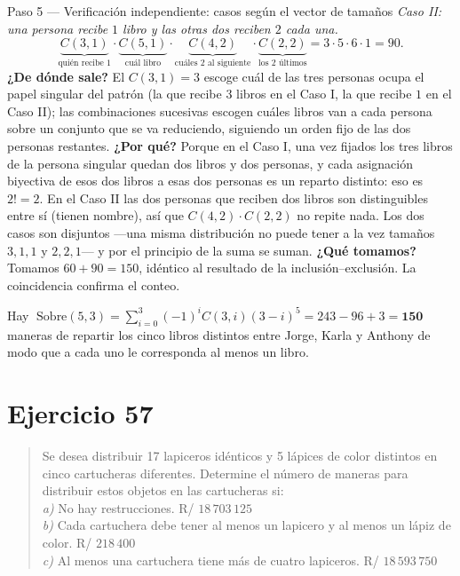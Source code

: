 \documentclass[11pt]{article}
\begin{document}
\begin{sol}
\begin{paso}{Paso 5 --- Verificación independiente: casos según el vector de tamaños}
\medskip
\emph{Caso II: una persona recibe $1$ libro y las otras dos reciben $2$ cada una.}
\[
\underbrace{C(3,1)}_{\text{quién recibe }1}\cdot\underbrace{C(5,1)}_{\text{cuál libro}}\cdot\underbrace{C(4,2)}_{\text{cuáles 2 al siguiente}}\cdot\underbrace{C(2,2)}_{\text{los 2 últimos}}=3\cdot 5\cdot 6\cdot 1=90 .
\]
\textbf{¿De dónde sale?} El $C(3,1)=3$ escoge cuál de las tres personas ocupa el papel singular del patrón (la que recibe $3$ libros en el Caso I, la que recibe $1$ en el Caso II); las combinaciones sucesivas escogen cuáles libros van a cada persona sobre un conjunto que se va reduciendo, siguiendo un orden fijo de las dos personas restantes.
\textbf{¿Por qué?} Porque en el Caso I, una vez fijados los tres libros de la persona singular quedan dos libros y dos personas, y cada asignación biyectiva de esos dos libros a esas dos personas es un reparto distinto: eso es $2!=2$. En el Caso II las dos personas que reciben dos libros son distinguibles entre sí (tienen nombre), así que $C(4,2)\cdot C(2,2)$ no repite nada. Los dos casos son disjuntos —una misma distribución no puede tener a la vez tamaños $3,1,1$ y $2,2,1$— y por el principio de la suma se suman.
\textbf{¿Qué tomamos?} Tomamos $60+90=150$, idéntico al resultado de la inclusión--exclusión. La coincidencia confirma el conteo.
\end{paso}

\end{sol}

\begin{resp}
Hay $\;\text{Sobre}(5,3)=\sum_{i=0}^{3}(-1)^iC(3,i)(3-i)^5=243-96+3=\mathbf{150}\;$ maneras de repartir los cinco libros distintos entre Jorge, Karla y Anthony de modo que a cada uno le corresponda al menos un libro.
\end{resp}

\section*{Ejercicio 57}

\begin{quote}
Se desea distribuir 17 lapiceros idénticos y 5 lápices de color distintos en cinco cartucheras diferentes. Determine el número de maneras para distribuir estos objetos en las cartucheras si:\\
\textit{a)} No hay restrucciones. \hfill R/ $18\,703\,125$\\
\textit{b)} Cada cartuchera debe tener al menos un lapicero y al menos un lápiz de color. \hfill R/ $218\,400$\\
\textit{c)} Al menos una cartuchera tiene más de cuatro lapiceros. \hfill R/ $18\,593\,750$
\end{quote}
\end{document}
